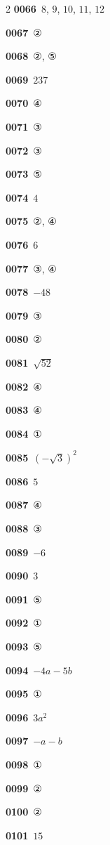 \documentclass[10pt,a4paper]{article}
\begin{document}
\begin{multicols}{2}
\noindent\textbf{0066}\ $8$, $9$, $10$, $11$, $12$\par
\noindent\textbf{0067}\ ②\par
\noindent\textbf{0068}\ ②, ⑤\par
\noindent\textbf{0069}\ $237$\par
\noindent\textbf{0070}\ ④\par
\noindent\textbf{0071}\ ③\par
\noindent\textbf{0072}\ ③\par
\noindent\textbf{0073}\ ⑤\par
\noindent\textbf{0074}\ $4$\par
\noindent\textbf{0075}\ ②, ④\par
\noindent\textbf{0076}\ $6$\par
\noindent\textbf{0077}\ ③, ④\par
\noindent\textbf{0078}\ $-48$\par
\noindent\textbf{0079}\ ③\par
\noindent\textbf{0080}\ ②\par
\noindent\textbf{0081}\ $\sqrt{52}$\par
\noindent\textbf{0082}\ ④\par
\noindent\textbf{0083}\ ④\par
\noindent\textbf{0084}\ ①\par
\noindent\textbf{0085}\ $(-\sqrt{3})^2$\par
\noindent\textbf{0086}\ $5$\par
\noindent\textbf{0087}\ ④\par
\noindent\textbf{0088}\ ③\par
\noindent\textbf{0089}\ $-6$\par
\noindent\textbf{0090}\ $3$\par
\noindent\textbf{0091}\ ⑤\par
\noindent\textbf{0092}\ ①\par
\noindent\textbf{0093}\ ⑤\par
\noindent\textbf{0094}\ $-4a-5b$\par
\noindent\textbf{0095}\ ①\par
\noindent\textbf{0096}\ $3a^2$\par
\noindent\textbf{0097}\ $-a-b$\par
\noindent\textbf{0098}\ ①\par
\noindent\textbf{0099}\ ②\par
\noindent\textbf{0100}\ ②\par
\noindent\textbf{0101}\ $15$\par

\end{multicols}
\end{document}

